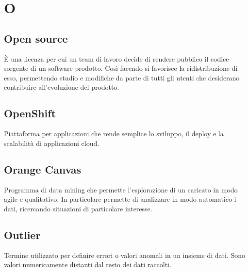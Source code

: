 \section*{O}
\markright{}

\subsection*{Open source}
È una licenza per cui un team di lavoro decide di rendere pubblico il codice sorgente di un software prodotto. Così facendo si favorisce la ridistribuzione di esso, permettendo studio e modifiche da parte di tutti gli utenti che desiderano contribuire all'evoluzione del prodotto.

\subsection*{OpenShift}
Piattaforma per applicazioni  che rende semplice lo sviluppo, il deploy e la scalabilità di applicazioni cloud.

\subsection*{Orange Canvas}
Programma di data mining  che permette l'esplorazione di un  caricato in modo agile e qualitativo. In particolare permette di analizzare in modo automatico i dati, ricercando situazioni di particolare interesse.

\subsection*{Outlier}
Termine utilizzato per definire errori o valori anomali in un insieme di dati. Sono valori numericamente distanti dal resto dei dati raccolti.